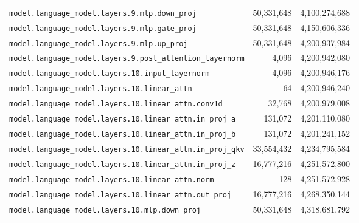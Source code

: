 \documentclass[10pt,a4paper]{article}
\theoremstyle{definition}
\begin{document}
\begin{appendices}
\begin{longtable}{p{9.5cm}rr}
\texttt{model.\allowbreak{}language\_model.\allowbreak{}layers.\allowbreak{}9.\allowbreak{}mlp.\allowbreak{}down\_proj} & 50,331,648 & 4,100,274,688 \\
\texttt{model.\allowbreak{}language\_model.\allowbreak{}layers.\allowbreak{}9.\allowbreak{}mlp.\allowbreak{}gate\_proj} & 50,331,648 & 4,150,606,336 \\
\texttt{model.\allowbreak{}language\_model.\allowbreak{}layers.\allowbreak{}9.\allowbreak{}mlp.\allowbreak{}up\_proj} & 50,331,648 & 4,200,937,984 \\
\texttt{model.\allowbreak{}language\_model.\allowbreak{}layers.\allowbreak{}9.\allowbreak{}post\_attention\_layernorm} & 4,096 & 4,200,942,080 \\
\texttt{model.\allowbreak{}language\_model.\allowbreak{}layers.\allowbreak{}10.\allowbreak{}input\_layernorm} & 4,096 & 4,200,946,176 \\
\texttt{model.\allowbreak{}language\_model.\allowbreak{}layers.\allowbreak{}10.\allowbreak{}linear\_attn} & 64 & 4,200,946,240 \\
\texttt{model.\allowbreak{}language\_model.\allowbreak{}layers.\allowbreak{}10.\allowbreak{}linear\_attn.\allowbreak{}conv1d} & 32,768 & 4,200,979,008 \\
\texttt{model.\allowbreak{}language\_model.\allowbreak{}layers.\allowbreak{}10.\allowbreak{}linear\_attn.\allowbreak{}in\_proj\_a} & 131,072 & 4,201,110,080 \\
\texttt{model.\allowbreak{}language\_model.\allowbreak{}layers.\allowbreak{}10.\allowbreak{}linear\_attn.\allowbreak{}in\_proj\_b} & 131,072 & 4,201,241,152 \\
\texttt{model.\allowbreak{}language\_model.\allowbreak{}layers.\allowbreak{}10.\allowbreak{}linear\_attn.\allowbreak{}in\_proj\_qkv} & 33,554,432 & 4,234,795,584 \\
\texttt{model.\allowbreak{}language\_model.\allowbreak{}layers.\allowbreak{}10.\allowbreak{}linear\_attn.\allowbreak{}in\_proj\_z} & 16,777,216 & 4,251,572,800 \\
\texttt{model.\allowbreak{}language\_model.\allowbreak{}layers.\allowbreak{}10.\allowbreak{}linear\_attn.\allowbreak{}norm} & 128 & 4,251,572,928 \\
\texttt{model.\allowbreak{}language\_model.\allowbreak{}layers.\allowbreak{}10.\allowbreak{}linear\_attn.\allowbreak{}out\_proj} & 16,777,216 & 4,268,350,144 \\
\texttt{model.\allowbreak{}language\_model.\allowbreak{}layers.\allowbreak{}10.\allowbreak{}mlp.\allowbreak{}down\_proj} & 50,331,648 & 4,318,681,792 \\

\end{longtable}
\end{appendices}
\end{document}
